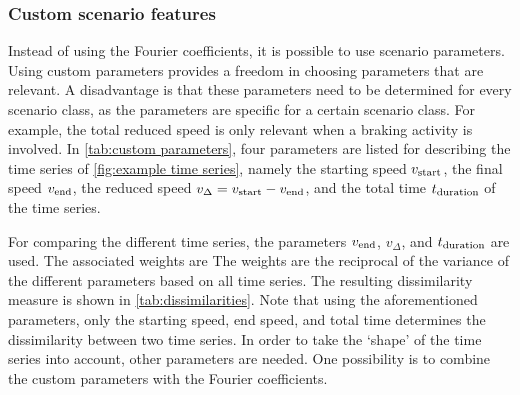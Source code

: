 \documentclass[10pt,final,a4paper,oneside,onecolumn]{article}
\newcommand{\parvstart}{v_{\textup{start}}}
\newcommand{\parvend}{v_{\textup{end}}}
\newcommand{\pardv}{v_{\Delta}}
\newcommand{\pardt}{t_{\textup{duration}}}
\theoremstyle{plain}\newtheorem{definition}{Definition}[section]    %
\theoremstyle{definition}\newtheorem{example}{Example}[section]     %
\theoremstyle{remark}\newtheorem{remarkenv}{Remark}[section]        %
\begin{document}
\begin{table}
	\centering
	\caption{Dissimilarity measures according to \cref{eq:eucl features}, with Fourier coefficients (see \cref{sec:fourier coefficient}), custom scenario features (see \cref{sec:custom features}), parameters of an auto-regression model fit (see \cref{sec:auto regression models}), and splines parameters (see \cref{sec:spline models}). The last column shows the dissimilarity measure of \cref{eq:dtw cost} divided over the sum of the number of samples of both time series (see \cref{sec:elastic measures}).}
	\label{tab:dissimilarities}
	
\end{table}


\subsubsection{Custom scenario features}
\label{sec:custom features}

Instead of using the Fourier coefficients, it is possible to use scenario parameters. Using custom parameters provides a freedom in choosing parameters that are relevant. A disadvantage is that these parameters need to be determined for every scenario class, as the parameters are specific for a certain scenario class. For example, the total reduced speed is only relevant when a braking activity is involved. In \cref{tab:custom parameters}, four parameters are listed for describing the time series of \cref{fig:example time series}, namely the starting speed $\parvstart$, the final speed $\parvend$, the reduced speed $\pardv=\parvstart-\parvend$, and the total time $\pardt$ of the time series.

\begin{table}
	\centering
	\caption{Custom parameters for describing the time series of \cref{fig:example time series}.}
	\label{tab:custom parameters}
	
\end{table}

For comparing the different time series, the parameters $\parvend$, $\pardv$, and $\pardt$ are used. The associated weights are 
The weights are the reciprocal of the variance of the different parameters based on all time series. The resulting dissimilarity measure is shown in \cref{tab:dissimilarities}. Note that using the aforementioned parameters, only the starting speed, end speed, and total time determines the dissimilarity between two time series. In order to take the `shape' of the time series into account, other parameters are needed. One possibility is to combine the custom parameters with the Fourier coefficients. 
\end{document}

